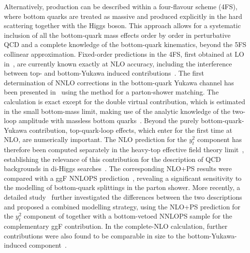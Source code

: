 Alternatively, \bbH{} production can be described within a four-flavour scheme (4FS), where bottom quarks are treated as massive and produced explicitly in the hard scattering together with the Higgs boson. This approach allows for a systematic inclusion of all the bottom-quark mass effects order by order in perturbative QCD and a complete knowledge of the bottom-quark kinematics, beyond the 5FS collinear approximation. Fixed-order predictions in the 4FS, first obtained at LO in~, are currently known exactly at NLO accuracy, including the interference between top- and bottom-Yukawa induced contributions~\cite{Dittmaier:2003ej,Dawson:2003kb,Wiesemann:2014ioa}. The first determination of NNLO corrections in the bottom-quark Yukawa channel has been presented in~ using the \minnlo{} method for a parton-shower matching. The calculation is exact except for the double virtual contribution, which is estimated in the small bottom-mass limit, making use of the analytic knowledge of the two-loop amplitude with massless bottom quarks~\cite{Badger:2021ega,Badger:2024mir}. Beyond the purely bottom-quark-Yukawa contribution, top-quark-loop effects, which enter for the first time at NLO, are numerically important. The NLO prediction for the $y_t^2$ component has therefore been computed separately in the heavy-top effective field theory limit~\cite{Deutschmann:2018avk}, establishing the relevance of this contribution for the description of QCD backgrounds in di-Higgs searches~\cite{Manzoni:2023qaf}. The corresponding NLO+PS results were compared with a ggF NNLOPS prediction~\cite{Hamilton:2013fea}, revealing a significant sensitivity to the modelling of bottom-quark splittings in the parton shower. More recently, a detailed study~\cite{ATLAS:2025dix} further investigated the differences between the two descriptions and proposed a combined modelling strategy, using the NLO+PS prediction for the $y_t^2$ component of \bbH{} together with a bottom-vetoed NNLOPS sample for the complementary ggF contribution. In the complete-NLO calculation, further contributions were also found to be comparable in size to the bottom-Yukawa-induced component~\cite{Pagani:2020rsg}.

